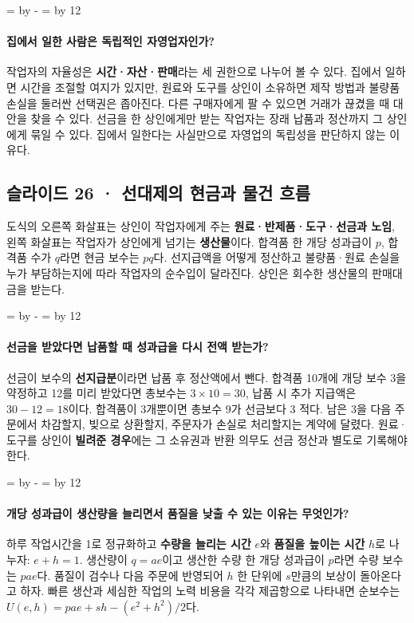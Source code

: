 \documentclass[10pt,a4paper]{article}
\newcommand{\ReserveQuestionSpace}{%
  \par\begingroup
  \dimen0=\pagegoal \advance\dimen0 by -\pagetotal
  \dimen2=\baselineskip \multiply\dimen2 by 12
  \ifdim\dimen0<\dimen2 \newpage\fi
  \endgroup}
\begin{document}
\ReserveQuestionSpace
\paragraph{집에서 일한 사람은 독립적인 자영업자인가?}

작업자의 자율성은 \textbf{시간·자산·판매}라는 세 권한으로 나누어 볼 수 있다. 집에서 일하면 시간을 조절할 여지가 있지만, 원료와 도구를 상인이 소유하면 제작 방법과 불량품 손실을 둘러싼 선택권은 좁아진다. 다른 구매자에게 팔 수 있으면 거래가 끊겼을 때 대안을 찾을 수 있다. 선금을 한 상인에게만 받는 작업자는 장래 납품과 정산까지 그 상인에게 묶일 수 있다. 집에서 일한다는 사실만으로 자영업의 독립성을 판단하지 않는 이유다.\par

\subsection{슬라이드 26 · 선대제의 현금과 물건 흐름}
도식의 오른쪽 화살표는 상인이 작업자에게 주는 \textbf{원료·반제품·도구·선금과 노임}, 왼쪽 화살표는 작업자가 상인에게 넘기는 \textbf{생산물}이다. 합격품 한 개당 성과급이 $p$, 합격품 수가 $q$라면 현금 보수는 $pq$다. 선지급액을 어떻게 정산하고 불량품·원료 손실을 누가 부담하는지에 따라 작업자의 순수입이 달라진다. 상인은 회수한 생산물의 판매대금을 받는다.\par

\ReserveQuestionSpace
\paragraph{선금을 받았다면 납품할 때 성과급을 다시 전액 받는가?}

선금이 보수의 \textbf{선지급분}이라면 납품 후 정산액에서 뺀다. 합격품 10개에 개당 보수 3을 약정하고 12를 미리 받았다면 총보수는 $3\times10=30$, 납품 시 추가 지급액은 $30-12=18$이다. 합격품이 3개뿐이면 총보수 9가 선금보다 3 적다. 남은 3을 다음 주문에서 차감할지, 빚으로 상환할지, 주문자가 손실로 처리할지는 계약에 달렸다. 원료·도구를 상인이 \textbf{빌려준 경우}에는 그 소유권과 반환 의무도 선금 정산과 별도로 기록해야 한다.\par

\ReserveQuestionSpace
\paragraph{개당 성과급이 생산량을 늘리면서 품질을 낮출 수 있는 이유는 무엇인가?}
하루 작업시간을 1로 정규화하고 \textbf{수량을 늘리는 시간} $e$와 \textbf{품질을 높이는 시간} $h$로 나누자: $e+h=1$. 생산량이 $q=ae$이고 생산한 수량 한 개당 성과급이 $p$라면 수량 보수는 $pae$다. 품질이 검수나 다음 주문에 반영되어 $h$ 한 단위에 $s$만큼의 보상이 돌아온다고 하자. 빠른 생산과 세심한 작업의 노력 비용을 각각 제곱항으로 나타내면 순보수는 $U(e,h)=pae+sh-(e^2+h^2)/2$다.\par
\end{document}
